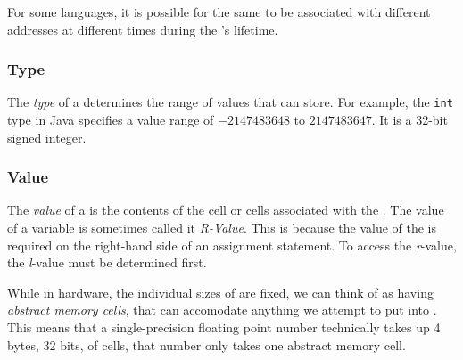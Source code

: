 For some languages, it is possible for the same  to be associated with different addresses at different times during the 's lifetime.

\subsubsection{Type}\label{subsubsec:Variable_Type}
\begin{definition}[Type]\label{def:Variable_Type}
  The \emph{type} of a  determines the range of values that  can store.
  For example, the \texttt{int} type in Java specifies a value range of $-2147483648$ to $2147483647$.
  It is a 32-bit signed integer.
\end{definition}

\subsubsection{Value}\label{subsubsec:Variable_Value}
\begin{definition}[Value]\label{def:Variable_Value}
  The \emph{value} of a  is the contents of the  cell or cells associated with the .
  The value of a variable is sometimes called it \emph{R-Value}.
  This is because the value of the  is required on the right-hand side of an assignment statement.
  To access the \textit{r}-value, the \textit{l}-value must be determined first.
  
  \begin{remark}\label{rmk:Abstract_Memory_Cells}
    While in hardware, the individual sizes of  are fixed, we can think of  as having \emph{abstract memory cells}, that can accomodate anything we attempt to put into .
    This means that a single-precision floating point number technically takes up 4 bytes, 32 bits, of  cells, that number only takes one abstract memory cell.
  \end{remark}
\end{definition}

